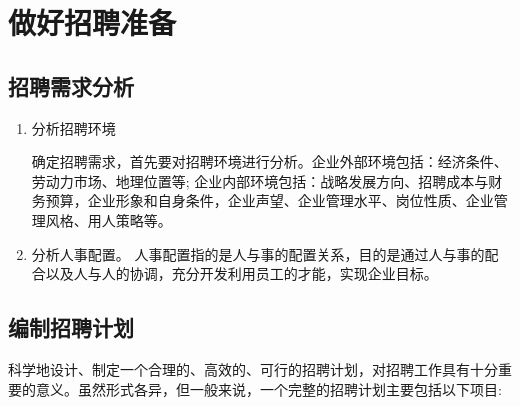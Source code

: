 \section {做好招聘准备}

\subsection {招聘需求分析}

    \begin{enumerate}
        \item 分析招聘环境

        确定招聘需求，首先要对招聘环境进行分析。企业外部环境包括：经济条件、劳动力市场、地理位置等; 企业内部环境包括：战略发展方向、招聘成本与财务预算，企业形象和自身条件，企业声望、企业管理水平、岗位性质、企业管理风格、用人策略等。

        \item 分析人事配置。
        人事配置指的是人与事的配置关系，目的是通过人与事的配合以及人与人的协调，充分开发利用员工的才能，实现企业目标。
    \end{enumerate}

\subsection {编制招聘计划}

    科学地设计、制定一个合理的、高效的、可行的招聘计划，对招聘工作具有十分重要的意义。虽然形式各异，但一般来说，一个完整的招聘计划主要包括以下项目:

